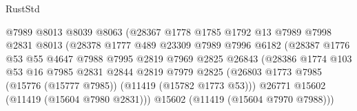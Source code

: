 \begin{lexlean}{RustStd}
\begin{coremodule}
                                      @7989
                                      @8013
                                      @8039
                                      @8063
                                      (@28367
                                        @1778
                                        @1785
                                        @1792
                                        @13
                                        @7989
                                        @7998
                                        @2831
                                        @8013
                                        (@28378
                                          @1777
                                          @489
                                          @23309
                                          @7989
                                          @7996
                                          @6182
                                          (@28387
                                            @1776
                                            @53
                                            @55
                                            @4647
                                            @7988
                                            @7995
                                            @2819
                                            @7969
                                            @2825
                                            @26843
                                            (@28386
                                              @1774
                                              @103
                                              @53
                                              @16
                                              @7985
                                              @2831
                                              @2844
                                              @2819
                                              @7979
                                              @2825
                                              (@26803
                                                @1773
                                                @7985
                                                (@15776 (@15777 @7985))
                                                (@11419 (@15782 @1773 @53)))
                                              @26771
                                              @15602
                                              (@11419 (@15604 @7980 @2831)))
                                            @15602
                                            (@11419 (@15604 @7970 @7988)))

\end{coremodule}
\end{lexlean}
